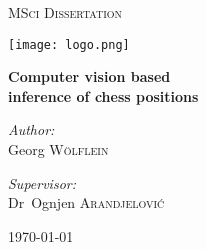 \begin{titlepage}
	\centering
	
	{\scshape\LARGE MSci Dissertation\par}
	\vspace{0.25cm}
	{\texttt{[image: logo.png]} \par}
	\vspace{0.25cm}
	{\huge\bfseries Computer vision based\\inference of chess positions\par}
	\vspace{0.5cm}

	\vfill

	\noindent
	\begin{minipage}{0.45\textwidth}
		\begin{center} \large
		  \textit{Author:}\\
          Georg \textsc{Wölflein}\\
		\end{center}
    \end{minipage}%
    \begin{minipage}{0.45\textwidth}
		\begin{center} \large
		\textit{Supervisor:} \\
		Dr~Ognjen \textsc{Arandjelović}
		\end{center}
	\end{minipage}%

	\vfill

	{\today\par}
\end{titlepage}
